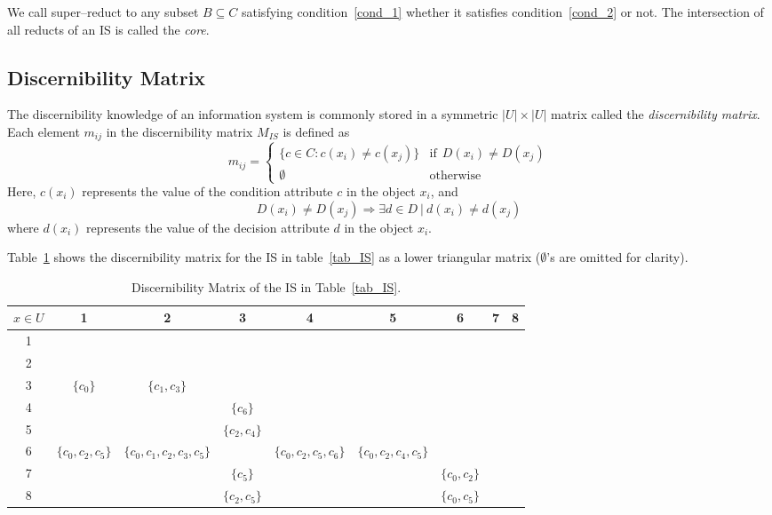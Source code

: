 \documentclass[authoryear,preprint,review,12pt]{elsarticle}
\begin{document}
  We call super--reduct to any subset $B \subseteq C$ satisfying condition~\ref{cond_1} whether it satisfies
  condition~\ref{cond_2} or not. The intersection of all reducts of an IS is called the \textit{core}.
  
\subsection{Discernibility Matrix}
  The discernibility knowledge of an information system is commonly stored in a symmetric $|U| \times |U|$
  matrix called the \textit{discernibility matrix}. Each element $m_{ij}$ in the discernibility matrix 
  $M_{IS}$ is defined as   
  \begin{equation}
  	m_{ij}=\left\lbrace\begin{array}{cl}
  			\lbrace c \in C: c(x_i) \neq c(x_j) \rbrace & \mathrm{if~~}D(x_i) \neq D(x_j)\\
  			\emptyset 								   & \mathrm{otherwise} 
  	\end{array}\right.
  \end{equation}  
  Here, $c(x_i)$ represents the value of the condition attribute $c$ in the object $x_i$, and 
  $$D(x_i) \neq D(x_j) \Rightarrow \exists d \in D~ |~ d(x_i) \neq d(x_j)$$ 
  where $d(x_i)$ represents the value  of the decision attribute $d$ in the object $x_i$.
  
  Table~\ref{tab_DM} shows the discernibility matrix for the IS in table~\ref{tab_IS} as a lower triangular 
  matrix ($\emptyset$'s are omitted for clarity).
  
   \begin{table}[htb]
		\caption{Discernibility Matrix of the IS in Table~\ref{tab_IS}.} \label{tab_DM}
		\centering \scriptsize
 	\begin{tabular}{c|cccccccc}
 		$x \in U$ & 1 & 2 &  3 & 4 & 5 &  6 & 7 & 8 \\
 		\hline
		1 &&&&&&&&\\
		2 &&&&&&&&\\
		3 & $\lbrace c_0\rbrace$ & $\lbrace c_1,c_3\rbrace$ &&&&&&\\
		4 &&& $\lbrace c_6\rbrace$ &&&&\\
		5 &&& $\lbrace c_2,c_4\rbrace$ &&&&\\
		6 & $\lbrace c_0,c_2,c_5\rbrace$ & $\lbrace c_0,c_1,c_2,c_3,c_5\rbrace$ && 
			$\lbrace c_0,c_2,c_5,c_6\rbrace$ & $\lbrace c_0,c_2,c_4,c_5\rbrace$ &&\\
		7 &&& $\lbrace c_5\rbrace$ &&& $\lbrace c_0,c_2\rbrace$ &\\
		8 &&& $\lbrace c_2,c_5\rbrace$ &&& $\lbrace c_0,c_5\rbrace$ &\\
 	\end{tabular}             
 \end{table}
  
\end{document}
